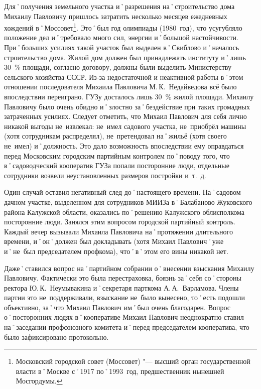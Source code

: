 Для˚получения земельного участка и˚разрешения на˚строительство дома Михаилу Павловичу пришлось затратить несколько месяцев ежедневных хождений в˚Моссовет\footnote{Московский городской совет (Моссовет) "--- высший орган государственной власти в˚Москве с˚1917 по˚1993~год, предшественник нынешней Мосгордумы.}. Это˚был год олимпиады (1980~год), что усугубляло положение дел и˚требовало много сил, энергии и˚большой настойчивости. При˚больших усилиях такой участок был выделен в˚Свиблово и˚началось строительство дома. Жилой дом должен был принадлежать институту и˚лишь 30~\% площади, согласно договору, должны были выделить Министерству сельского хозяйства СССР. Из-за недостаточной и неактивной работы в˚этом отношении последователя Михаила Павловича М.\,К.~Недайведова всё было впоследствии переиграно. ГУЗу досталось лишь 30~\% жилой площади. Михаилу Павловичу было очень обидно и˚злостно за˚бездействие при таких громадных затраченных усилиях. Следует отметить, что Михаил Павлович для себя лично никакой выгоды не~извлекал: не~имел садового участка, не~приобрёл машины (хотя сотрудникам распределял), не~претендовал на˚жильё (хотя своего не~имел) и˚должность. Это дало возможность впоследствии ему оправдаться перед Московским городским партийным контролем по˚поводу того, что в˚садоводческий кооператив ГУЗа попали посторонние люди, отдельные сотрудники возвели неустановленных размеров постройки и~т.~д. 

Один случай оставил негативный след до˚настоящего времени. На˚садовом дачном участке, выделенном для сотрудников МИИЗа в˚Балабаново Жуковского района Калужской области, оказались по˚решению Калужского облисполкома посторонние люди. Занялся этим вопросом городской партийный контроль. Каждый вечер вызывали Михаила Павловича на˚протяжении длительного времени, и˚он˚должен был докладывать (хотя Михаил Павлович˚уже и˚не~был председателем профкома), что˚в˚этом его вины никакой нет.

Даже˚ставился вопрос на˚партийном собрании о˚внесении взыскания Михаилу Павловичу. Фактически это была перестраховка, боязнь за˚себя со˚стороны ректора Ю.\,К.~Неумывакина и˚секретаря парткома А.\,А.~Варламова. Члены партии это не~поддерживали, взыскание не~было вынесено, то˚есть подошли объективно, за˚что Михаил Павлович им˚был очень благодарен. Вопрос о˚посторонних людях в˚кооперативе Михаил Павлович неоднократно ставил на˚заседании профсоюзного комитета и˚перед председателем кооператива, что было зафиксировано протокольно.

